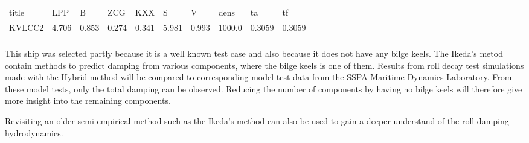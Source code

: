             
    
    \begin{longtable}[c]{@{}llllllllll@{}}
\toprule\addlinespace
title & LPP & B & ZCG & KXX & S & V & dens & ta & tf\\\addlinespace 
\midrule\endhead
KVLCC2 & 4.706 & 0.853 & 0.274 & 0.341 & 5.981 & 0.993 & 1000.0 & 0.3059 & 0.3059\\\addlinespace 
\bottomrule 
 \end{longtable}

    

    This ship was selected partly because it is a well known test case and
also because it does not have any bilge keels. The Ikeda's metod contain
methods to predict damping from various components, where the bilge
keels is one of them. Results from roll decay test simulations made with
the Hybrid method will be compared to corresponding model test data from
the SSPA Maritime Dynamics Laboratory. From these model tests, only the
total damping can be observed. Reducing the number of components by
having no bilge keels will therefore give more insight into the
remaining components.

Revisiting an older semi-empirical method such as the Ikeda's method can
also be used to gain a deeper understand of the roll damping
hydrodynamics.

    